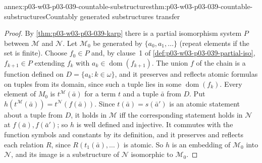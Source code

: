 \begin{annexitem}{annex:p03-w03-p03-039-countable-substructures}{thm:p03-w03-p03-039-countable-substructures}{Countably generated substructures transfer}
\begin{proof}
By \cref{thm:p03-w03-p03-039-karp} there is a partial isomorphism system
\(P\) between \(\mathcal M\) and \(\mathcal N\). Let \(\mathcal M_0\) be
generated by \(\{a_0,a_1,\ldots\}\) (repeat elements if the set is finite).
Choose \(f_0\in P\) and, by clause~1 of
\cref{def:p03-w03-p03-039-partial-iso}, \(f_{k+1}\in P\) extending \(f_k\)
with \(a_k\in\operatorname{dom}(f_{k+1})\). The union \(f\) of the chain is a
function defined on \(D=\{a_k:k\in\omega\}\), and it preserves and reflects
atomic formulas on tuples from its domain, since such a tuple lies in some
\(\operatorname{dom}(f_k)\). Every element of \(M_0\) is \(t^{\mathcal M}(\bar a)\)
for a term \(t\) and a tuple \(\bar a\) from \(D\). Put
\(h(t^{\mathcal M}(\bar a))=t^{\mathcal N}(f(\bar a))\). Since
\(t(\bar a)=s(\bar a')\) is an atomic statement about a tuple from \(D\), it
holds in \(\mathcal M\) iff the corresponding statement holds in
\(\mathcal N\) at \(f(\bar a),f(\bar a')\); so \(h\) is well defined and
injective. It commutes with the function symbols and constants by its
definition, and it preserves and reflects each relation \(R\), since
\(R(t_1(\bar a),\dots)\) is atomic. So \(h\) is an embedding of
\(\mathcal M_0\) into \(\mathcal N\), and its image is a substructure of
\(\mathcal N\) isomorphic to \(\mathcal M_0\).
\end{proof}
\end{annexitem}

